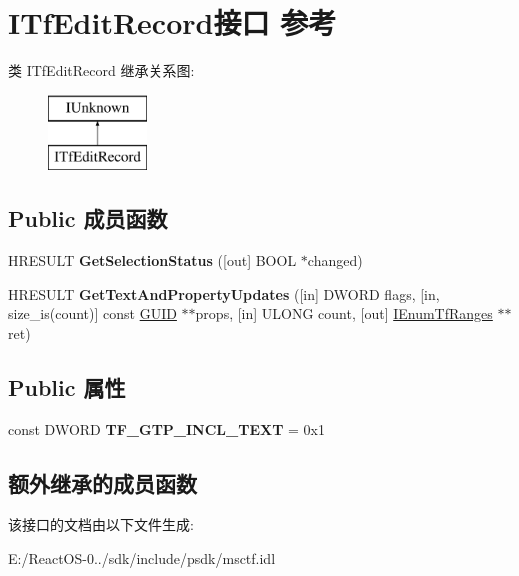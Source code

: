 \hypertarget{interface_i_tf_edit_record}{}\section{I\+Tf\+Edit\+Record接口 参考}
\label{interface_i_tf_edit_record}
类 I\+Tf\+Edit\+Record 继承关系图\+:\begin{figure}[H]
\begin{center}
\leavevmode
\includegraphics[height=2.000000cm]{interface_i_tf_edit_record}
\end{center}
\end{figure}
\subsection*{Public 成员函数}
\begin{DoxyCompactItemize}
\item 
\mbox{\label{interface_i_tf_edit_record_aed81b78b822ed02107c238030eaf9dd8}} 
H\+R\+E\+S\+U\+LT {\bfseries Get\+Selection\+Status} (\mbox{[}out\mbox{]} B\+O\+OL $\ast$changed)
\item 
\mbox{\label{interface_i_tf_edit_record_aecacf9031c00a972828b606b282cd2df}} 
H\+R\+E\+S\+U\+LT {\bfseries Get\+Text\+And\+Property\+Updates} (\mbox{[}in\mbox{]} D\+W\+O\+RD flags, \mbox{[}in, size\+\_\+is(count)\mbox{]} const \hyperlink{interface_g_u_i_d}{G\+U\+ID} $\ast$$\ast$props, \mbox{[}in\mbox{]} U\+L\+O\+NG count, \mbox{[}out\mbox{]} \hyperlink{interface_i_enum_tf_ranges}{I\+Enum\+Tf\+Ranges} $\ast$$\ast$ret)
\end{DoxyCompactItemize}
\subsection*{Public 属性}
\begin{DoxyCompactItemize}
\item 
\mbox{\label{interface_i_tf_edit_record_a73816ff9f01fe6bb7384f0af0a133b85}} 
const D\+W\+O\+RD {\bfseries T\+F\+\_\+\+G\+T\+P\+\_\+\+I\+N\+C\+L\+\_\+\+T\+E\+XT} = 0x1
\end{DoxyCompactItemize}
\subsection*{额外继承的成员函数}


该接口的文档由以下文件生成\+:\begin{DoxyCompactItemize}
\item 
E\+:/\+React\+O\+S-\/0../sdk/include/psdk/msctf.\+idl\end{DoxyCompactItemize}
